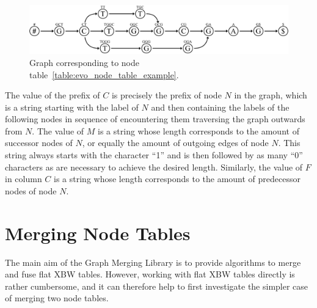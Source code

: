 \documentclass[a4paper,12pt,twoside,BCOR=10mm]{scrbook}
\begin{document}
\begin{figure}[!htb]
\centering
\includegraphics[width=\textwidth]{evo_fig_node_table_example.pdf}
\caption[Graph corresponding to a node table]{Graph corresponding to node table~\ref{table:evo_node_table_example}.} \label{fig:evo_fig_node_table_example}
\end{figure}
The value of the prefix of $ C $ is precisely the prefix of node $ N $ in the graph, 
which is a string starting with the label of $ N $ and then containing 
the labels of the following nodes in sequence of encountering them traversing 
the graph outwards from $ N $.
The value of $ M $ is a string whose length corresponds to 
the amount of successor nodes of $ N $, or equally the amount of outgoing edges of node $ N $. 
This string always starts with the character “1” and is then followed 
by as many “0” characters as are necessary to achieve the desired length. 
Similarly, the value of $ F $ in column $ C $ is a string whose length corresponds to 
the amount of predecessor nodes of node $ N $.

\section{Merging Node Tables}
%

The main aim of the Graph Merging Library is to provide algorithms 
to merge and fuse flat XBW tables. 
However, working with flat XBW tables directly is rather cumbersome, 
and it can therefore help to first investigate the simpler case 
of merging two node tables.

%
%
\end{document}
